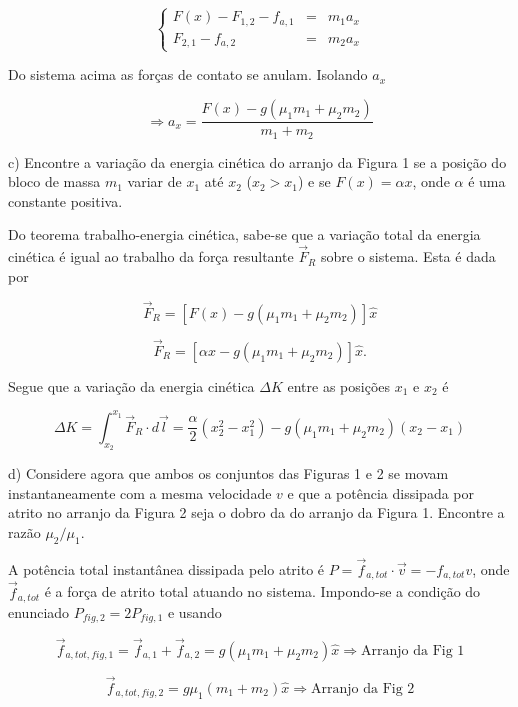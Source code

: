 \begin{enumerate}[start=1,label={\bfseries Q\arabic*.}]
\begin{itemize}
$$
\left\{
\begin{array}{ccc}
	F(x) - F_{1,2} - f_{a,1} & = & m_{1} a_{x} \\
	       F_{2,1} - f_{a,2} & = & m_{2} a_{x}
\end{array}
\right.
$$

Do sistema acima as forças de contato se anulam. Isolando $a_{x}$

$$
\Rightarrow a_{x}  = \frac{F(x) - g(\mu_{1}m_{1} + \mu_{2} m_{2})}{m_{1} + m_{2}}
$$
\end{itemize}

c) Encontre a variação da energia cinética do arranjo da Figura 1 se a posição do bloco de massa $m_{1}$ variar de $x_{1}$ até $x_{2}$ ($x_{2} > x_{1}$) e se $F(x) = \alpha x$, onde $\alpha$ é uma constante positiva.

\resposta

Do teorema trabalho-energia cinética, sabe-se que a variação total da energia cinética é igual ao trabalho da força resultante $\vec{F}_{R}$ sobre o sistema. Esta é dada por

$$
\vec{F}_{R} = [F(x) - g(\mu_{1}m_{1} + \mu_{2}m_{2})] \hat{x}
$$

$$
\vec{F}_{R} = [\alpha x - g(\mu_{1}m_{1} + \mu_{2}m_{2})] \hat{x}.
$$

Segue que a variação da energia cinética $\Delta K$ entre as posições $x_{1}$ e $x_{2}$ é

$$
\Delta K = \int_{x_{2}}^{x_{1}} \vec{F}_{R} \cdot d\vec{l} = \frac{\alpha}{2} (x_{2}^{2} - x_{1}^{2}) - g(\mu_{1}m_{1} + \mu_{2}m_{2})(x_{2} - x_{1})
$$

d) Considere agora que ambos os conjuntos das Figuras 1 e 2 se movam instantaneamente com a mesma velocidade $v$ e que a potência dissipada por atrito no arranjo da Figura 2 seja o dobro da do arranjo da Figura 1. Encontre a razão $\mu_{2}/\mu_{1}$.

\resposta

A potência total instantânea dissipada pelo atrito é $P = \vec{f}_{a,tot} \cdot \vec{v} = - f_{a,tot} v$, onde $\vec{f}_{a,tot}$ é a força de atrito total atuando no sistema. Impondo-se a condição do enunciado $P_{fig,2} = 2P_{fig,1}$ e usando

$$
 \vec{f}_{a,tot,fig,1} = \vec{f}_{a,1} + \vec{f}_{a,2} = g(\mu_{1}m_{1} + \mu_{2}m_{2})\hat{x} \Rightarrow \mbox{Arranjo da Fig 1}
$$

$$
 \vec{f}_{a,tot,fig,2} = g\mu_{1}(m_{1} + m_{2}) \hat{x} \Rightarrow \mbox{Arranjo da Fig 2}
$$


\end{enumerate}
